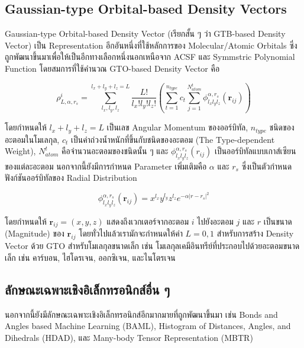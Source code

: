 \subsection{Gaussian-type Orbital-based Density Vectors}
\label{ssec:gauss_orb_den}

Gaussian-type Orbital-based Density Vector (เรียกสั้น ๆ ว่า GTB-based Density Vector) เป็น Representation 
อีกอันหนึ่งที่ใช้หลักการของ Molecular/Atomic Orbitals ซึ่งถูกพัฒนาขึ้นมาเพื่อให้เป็นอีกทางเลือกหนึ่งนอกเหนือจาก ACSF และ 
Symmstric Polynomial Function\autocite{kwac2021} โดยสมการที่ใช้คำนวณ GTO-based Density Vector คือ

\begin{equation}
    \rho^{i}_{L,\alpha,r_{s}} = \sum^{l_{x}+l_{y}+l_{z} = L}_{l_{x},l_{y},l_{z}} 
    \frac{L!}{l_{x}!l_{y}!l_{z}!} \left ( \sum^{n_{type}}_{t=1} c_{t} \sum^{N^{t}_{atom}}_{j=1} 
    \phi^{\alpha,r_{s}}_{l_{x}l_{y}l_{z}} (\boldsymbol{r}_{ij}) \right )
\end{equation}

\noindent โดยกำหนดให้ $l_{x}+l_{y}+l_{z} = L$ เป็นเลข Angular Momentum ของออร์บิทัล, $n_{type}$ ชนิดของอะตอมในโมเลกุล, 
$c_{t}$ เป็นค่าถ่วงน้ำหนักที่ขึ้นกับชนิดของอะตอม (The Type-dependent Weight), $N^{t}_{atom}$ คือจำนวนอะตอมของชนิดนั้น ๆ
และ $\phi^{\alpha,r_{s}}_{l_{x}l_{y}l_{z}} (r_{ij})$ เป็นออร์บิทัลแบบเกาส์เซียนของแต่ละอะตอม นอกจากนี้ยังมีการกำหนด 
Parameter เพิ่มเติมคือ $\alpha$ และ $r_{s}$ ซึ่งเป็นตัวกำหนดฟังก์ชันออร์บิทัลของ Radial Distribution

\begin{equation}
    \phi^{\alpha,r_{s}}_{l_{x}l_{y}l_{z}} (\boldsymbol{r}_{ij}) = x^{l_{x}}y^{l_{y}}z^{l_{z}} e^{-\alpha 
    |r-r_{s}|^{2}}
\end{equation}

\noindent โดยกำหนดให้ $\boldsymbol{r}_{ij} = (x,y,z)$ แสดงถึงเวกเตอร์จากอะตอม $i$ ไปยังอะตอม $j$ และ $r$ 
เป็นขนาด (Magnitude) ของ $\boldsymbol{r}_{ij}$ โดยทั่วไปแล้วเรามักจะกำหนดให้ค่า $L=0,1$ สำหรับการสร้าง Density Vector ด้วย GTO
สำหรับโมเลกุลขนาดเล็ก เช่น โมเลกุลเคมีอินทรีย์ที่ประกอบไปด้วยอะตอมขนาดเล็ก เช่น คาร์บอน, ไฮโดรเจน, ออกซิเจน, และไนโตรเจน\autocite{kwac2021}

\subsection{ลักษณะเฉพาะเชิงอิเล็กทรอนิกส์อื่น ๆ}
\label{ssec:other_feat_elec}

นอกจากนี้ยังมีลักษณะเฉพาะเชิงอิเล็กทรอนิกส์อีกมากมายที่ถูกพัฒนาขึ้นมา\autocite{faber2018} เช่น Bonds and Angles based Machine 
Learning (BAML)\autocite{huang2016}, Histogram of Distances, Angles, and Dihedrals (HDAD)\autocite{faber2017}, 
และ Many-body Tensor Representation (MBTR)\autocite{huo2018,langer2022}
